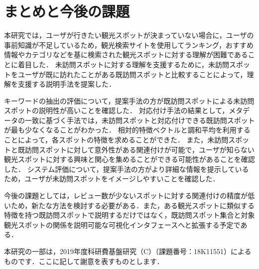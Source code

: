\documentclass[submit]{ipsj}
\begin{document}
\section{まとめと今後の課題}
\label{sec:まとめと今後の課題}

本研究では，ユーザが行きたい観光スポットが決まっていない場合に，ユーザの事前知識が不足しているため，観光検索サイトを使用してランキング，おすすめ情報やカテゴリなどを基に検索された観光スポットに対する理解が困難であることに着目した．
未訪問スポットに対する理解を支援するために，未訪問スポットをユーザが既に訪れたことがある既訪問スポットと比較することによって，理解を支援する説明手法を提案した．

キーワードの抽出の評価について，提案手法の方が既訪問スポットによる未訪問スポットの説明性が高いことを確認した．
対応付け手法の結果として，メタデータの一致に基づく手法では，未訪問スポットと対応付けできる既訪問スポットが最も少なくなることがわかった．
相対的特徴ベクトルと調和平均を利用することによって，各スポットの特徴を求めることができた．
また，未訪問スポットと既訪問スポットに対して意外性がある関連付けが可能で，ユーザが知らない観光スポットに対する興味と関心を集めることができる可能性があることを確認した．
システム評価について，提案手法の方がより詳細な情報を提示しているため，ユーザが未訪問スポットをイメージしやすいことを確認した．

今後の課題としては，レビュー数が少ないスポットに対する関連付けの精度が低いため，新たな方法を検討する必要がある．また，ある観光スポットに類似する特徴を持つ既訪問スポットで説明するだけではなく，既訪問スポット集合と対象観光スポットの関係を説明可能な可視化インタフェースへと拡張する予定である．



\begin{acknowledgment}
本研究の一部は，2019年度科研費基盤研究（C）（課題番号：18K11551）によるものです．ここに記して謝意を表すものとします．
\end{acknowledgment}
\end{document}
